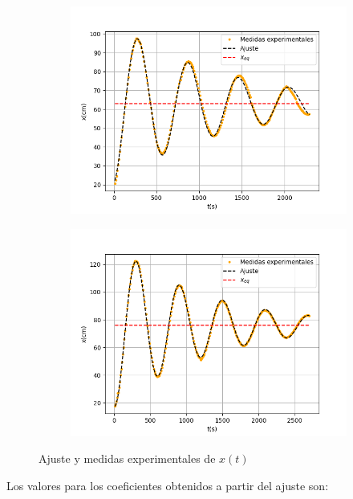 \documentclass[a4paper,12pt,titlepage]{article}
\begin{document}
\begin{figure}[h!]
    \centering
    \begin{subfigure}{0.49\textwidth}
        \centering
        \includegraphics[width=0.95\linewidth]{Images/disposicion1.png}
    \end{subfigure}
    \begin{subfigure}{0.49\textwidth}
        \centering
        \includegraphics[width=0.95\linewidth]{Images/disposicion2.png}
    \end{subfigure}
    \caption{Ajuste y medidas experimentales de $x(t)$}
\end{figure}

Los valores para los coeficientes obtenidos a partir del ajuste son:
\end{document}
